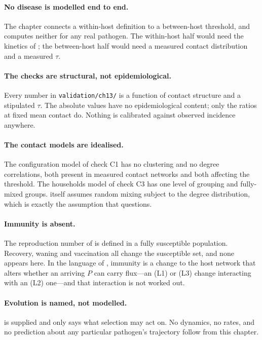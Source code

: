 \paragraph{No disease is modelled end to end.} The chapter connects a
within-host definition to a between-host threshold, and computes neither for
any real pathogen. The within-host half would need the kinetics of
; the between-host half would need a measured contact
distribution and a measured $\tau$.

\paragraph{The checks are structural, not epidemiological.} Every number in
\texttt{validation/ch13/} is a function of contact structure and a
stipulated $\tau$. The absolute values have no epidemiological content; only
the ratios at fixed mean contact do. Nothing is calibrated against observed
incidence anywhere.

\paragraph{The contact models are idealised.} The configuration model of
check C1 has no clustering and no degree correlations, both present in
measured contact networks and both affecting the threshold. The households
model of check C3 has one level of grouping and fully-mixed groups.
 itself assumes random mixing subject to the degree
distribution, which is exactly the assumption that 
questions.

\paragraph{Immunity is absent.} The reproduction number of
 is defined in a fully susceptible population.
Recovery, waning and vaccination all change the susceptible set, and none
appears here. In the language of , immunity is a
change to the host network that alters whether an arriving $P$ can carry
flux---an (L1) or (L3) change interacting with an (L2) one---and that
interaction is not worked out.

\paragraph{Evolution is named, not modelled.}  is
supplied and  only says what selection may act on. No
dynamics, no rates, and no prediction about any particular pathogen's
trajectory follow from this chapter.

